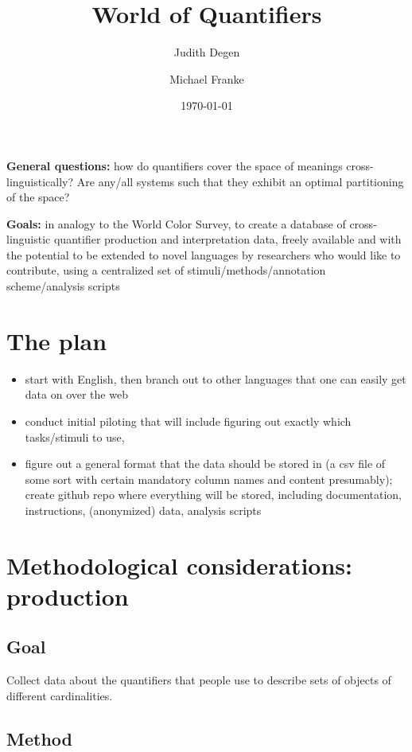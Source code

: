 \documentclass{article}
\title{World of Quantifiers}
\author{Judith Degen \and Michael Franke}
\date{\today}
\begin{document}
\maketitle



\textbf{General questions:} how do quantifiers cover the space of meanings cross-linguistically? Are any/all systems such that they exhibit an optimal partitioning of the space?

\textbf{Goals:} in analogy to the World Color Survey, to create a database of cross-linguistic quantifier production and interpretation data, freely available and with the potential to be extended to novel languages by researchers who would like to contribute, using a centralized set of stimuli/methods/annotation scheme/analysis scripts

\section{The plan}

\begin{itemize}
	\item start with English, then branch out to other languages that one can easily get data on over the web
	\item conduct initial piloting that will include figuring out exactly which tasks/stimuli to use, 
	\item figure out a general format that the data should be stored in (a csv file of some sort with certain mandatory column names and content presumably); create github repo where everything will be stored, including documentation, instructions, (anonymized) data, analysis scripts
\end{itemize}

\section{Methodological considerations: production}	

\subsection{Goal}

Collect data about the quantifiers that people use to describe sets of objects of different cardinalities.

\subsection{Method}
\end{document}
